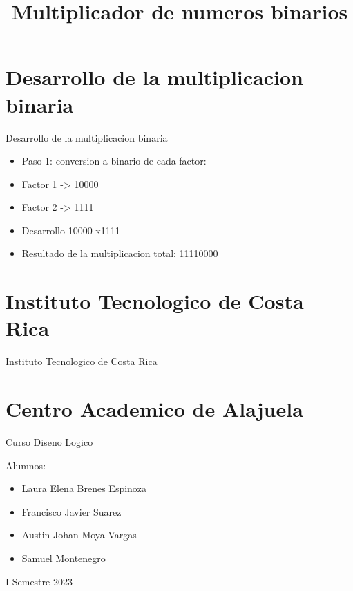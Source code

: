 \documentclass[11pt]{beamer}
\title{Multiplicador de numeros binarios}
\begin{document}
    \begin{frame}
        \maketitle
    \end{frame}
    \section{Desarrollo de la multiplicacion binaria}
    \begin{frame}{Desarrollo de la multiplicacion binaria}
        \begin{itemize}
        \item Paso 1: conversion a binario de cada factor:
        \item    Factor 1 -> 10000
        \item    Factor 2 -> 1111
        \item Desarrollo 
        \newline
      \hphantom{123456789101112}10000
        \newline      \hphantom{12345678910111}x1111
        \item Resultado de la multiplicacion total: 11110000
        \end{itemize}
    \end{frame}
    \section{Instituto Tecnologico de Costa Rica}
    \begin{frame}{Instituto Tecnologico de Costa Rica}    \section{Centro Academico de Alajuela}        Curso Diseno Logico 
        \newline

        Alumnos:
        \begin{itemize}
        \item Laura Elena Brenes Espinoza
        \item Francisco Javier Suarez 
        \item Austin Johan Moya Vargas
        \item Samuel Montenegro
        \end{itemize}

        I Semestre 2023
    \end{frame}
    
\end{document}
